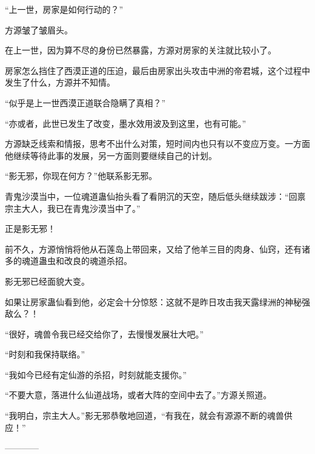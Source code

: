 \begin{this_body}
“上一世，房家是如何行动的？”

方源皱了皱眉头。

在上一世，因为算不尽的身份已然暴露，方源对房家的关注就比较小了。

房家怎么挡住了西漠正道的压迫，最后由房家出头攻击中洲的帝君城，这个过程中发生了什么，方源并不知情。

“似乎是上一世西漠正道联合隐瞒了真相？”

“亦或者，此世已发生了改变，墨水效用波及到这里，也有可能。”

方源缺乏线索和情报，思考不出什么对策，短时间内也只有以不变应万变。一方面他继续等待此事的发展，另一方面则要继续自己的计划。

“影无邪，你现在何方？”他联系影无邪。

青鬼沙漠当中，一位魂道蛊仙抬头看了看阴沉的天空，随后低头继续跋涉：“回禀宗主大人，我已在青鬼沙漠当中了。”

正是影无邪！

前不久，方源悄悄将他从石莲岛上带回来，又给了他羊三目的肉身、仙窍，还有诸多的魂道蛊虫和改良的魂道杀招。

影无邪已经面貌大变。

如果让房家蛊仙看到他，必定会十分惊怒：这就不是昨日攻击我天露绿洲的神秘强敌么？！

“很好，魂兽令我已经交给你了，去慢慢发展壮大吧。”

“时刻和我保持联络。”

“我如今已经有定仙游的杀招，时刻就能支援你。”

“不要大意，落进什么仙道战场，或者大阵的空间中去了。”方源关照道。

“我明白，宗主大人。”影无邪恭敬地回道，“有我在，就会有源源不断的魂兽供应！”

------------

\end{this_body}

